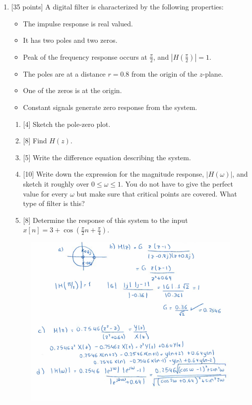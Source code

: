 \documentclass{article}
\begin{document}
\begin{enumerate}
    \newpage
    \item {[35 points]} A digital filter is characterized by the following properties:
    \begin{itemize}
        \item The impulse response is real valued.
        \item It has two poles and two zeros.
        \item Peak of the frequency response occurs at $\frac{\pi}{2}$, and $\left|H\left(\frac{\pi}{2}\right)\right| = 1$.
        \item The poles are at a distance $r=0.8$ from the origin of the $z$-plane.
        \item One of the zeros is at the origin.
        \item Constant signals generate zero response from the system.
    \end{itemize}
    \begin{enumerate}
        \item {[4]} Sketch the pole-zero plot.
        \item {[8]} Find $H(z)$.
        \item {[5]} Write the difference equation describing the system.
        \item {[10]} Write down the expression for the magnitude response, $|H(\omega)|$, and sketch it roughly over $0\leq \omega \leq 1$. You do not have to give the perfect value for every $\omega$ but make sure that critical points are covered. What type of filter is this?
        \item {[8]} Determine the response of this system to the input $x[n]=3+\cos\left(\frac{\pi}{2}n+\frac{\pi}{4}\right).$
    \end{enumerate}
    \begin{figure}[H]
        \centering
        \includegraphics[width=\textwidth]{mt2_q3_a_d.png}
    \end{figure}


\end{enumerate}
\end{document}
